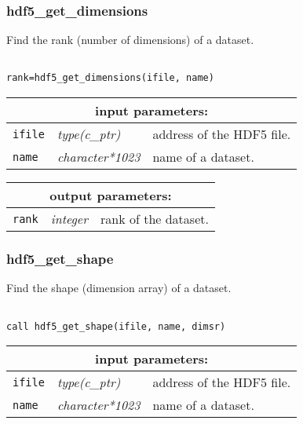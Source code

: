 \subsubsection{hdf5\_get\_dimensions}

Find the rank (number of dimensions) of a dataset.

\begin{verbatim}

rank=hdf5_get_dimensions(ifile, name)
\end{verbatim}

\noindent
\begin{tabular}{|p{1.5cm}|p{3cm}|p{10cm}|}
\hline
\multicolumn{3}{|c|}{\bf input parameters:} \\
\hline
{\tt ifile} & {\it type(c\_ptr)} & address of the HDF5 file. \\
\hline
{\tt name} & {\it character*1023} & name of a dataset. \\
\hline
\end{tabular}

\vskip 0.8cm

\noindent
\begin{tabular}{|p{1.5cm}|p{3cm}|p{10cm}|}
\hline
\multicolumn{3}{|c|}{\bf output parameters:} \\
\hline
{\tt rank} & {\it integer} & rank of the dataset. \\
\hline
\end{tabular}

\subsubsection{hdf5\_get\_shape}

Find the shape (dimension array) of a dataset.

\begin{verbatim}

call hdf5_get_shape(ifile, name, dimsr)
\end{verbatim}

\noindent
\begin{tabular}{|p{1.5cm}|p{3cm}|p{10cm}|}
\hline
\multicolumn{3}{|c|}{\bf input parameters:} \\
\hline
{\tt ifile} & {\it type(c\_ptr)} & address of the HDF5 file. \\
\hline
{\tt name} & {\it character*1023} & name of a dataset. \\
\hline
\end{tabular}

